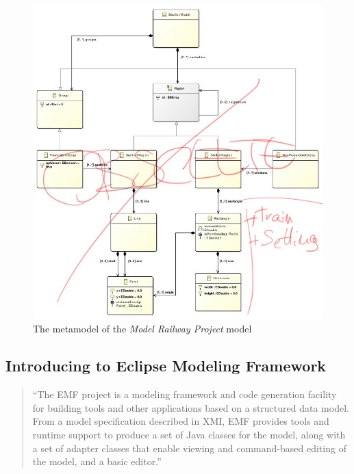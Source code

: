 \begin{figure}[p]
	\centering
	\includegraphics[width=\linewidth]{include/figures/chapter_6/sectionmodel}
	\caption{The metamodel of the \emph{Model Railway Project} model} 
	\label{fig:case_study:model}
\end{figure}

\subsection{Introducing to Eclipse Modeling Framework}
\begin{quotation}
	``The EMF project is a modeling framework and code generation facility for building tools and other applications based on a structured data model. From a model specification described in XMI, EMF provides tools and runtime support to produce a set of Java classes for the model, along with a set of adapter classes that enable viewing and command-based editing of the model, and a basic editor.'' \cite{EMF}
\end{quotation}

